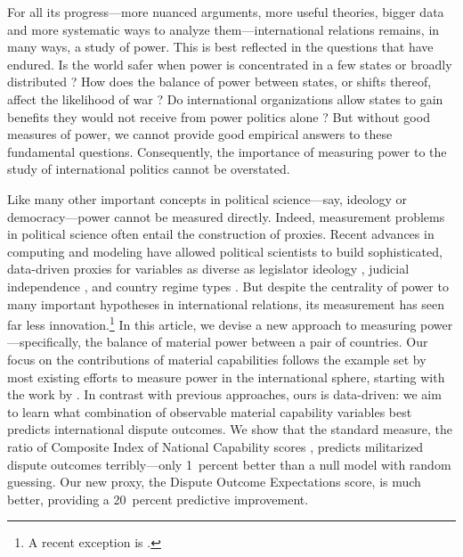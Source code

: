 
For all its progress---more nuanced arguments, more useful theories, bigger data and more systematic ways to analyze them---international relations remains, in many ways, a study of power.
This is best reflected in the questions that have endured.
Is the world safer when power is concentrated in a few states or broadly distributed \citep{waltz}?
How does the balance of power between states, or shifts thereof, affect the likelihood of war \citep{organski1980,powell1999,powell2006war}?
Do international organizations allow states to gain benefits they would not receive from power politics alone \citep{keohane}?
But without good measures of power, we cannot provide good empirical answers to these fundamental questions.
Consequently, the importance of measuring power to the study of international politics cannot be overstated.

Like many other important concepts in political science---say, ideology or democracy---power cannot be measured directly.
Indeed, measurement problems in political science often entail the construction of proxies.
Recent advances in computing and modeling have allowed political scientists to build sophisticated, data-driven proxies for variables as diverse as legislator ideology \citep{clinton2004}, judicial independence \citep{linzer2014}, and country regime types \citep{jackman2008}.
But despite the centrality of power to many important hypotheses in international relations, its measurement has seen far less innovation.\footnote{%
  A recent exception is \citet{Arena:2012}.
}
In this article, we devise a new approach to measuring power---specifically, the balance of material power between a pair of countries.
Our focus on the contributions of material capabilities follows the example set by most existing efforts to measure power in the international sphere, starting with the work by \citet{singer1972}.
In contrast with previous approaches, ours is data-driven: we aim to learn what combination of observable material capability variables best predicts international dispute outcomes.
We show that the standard measure, the ratio of Composite Index of National Capability scores \citep{singer1972}, predicts militarized dispute outcomes terribly---only 1~percent better than a null model with random guessing.
Our new proxy, the Dispute Outcome Expectations score, is much better, providing a 20~percent predictive improvement.

